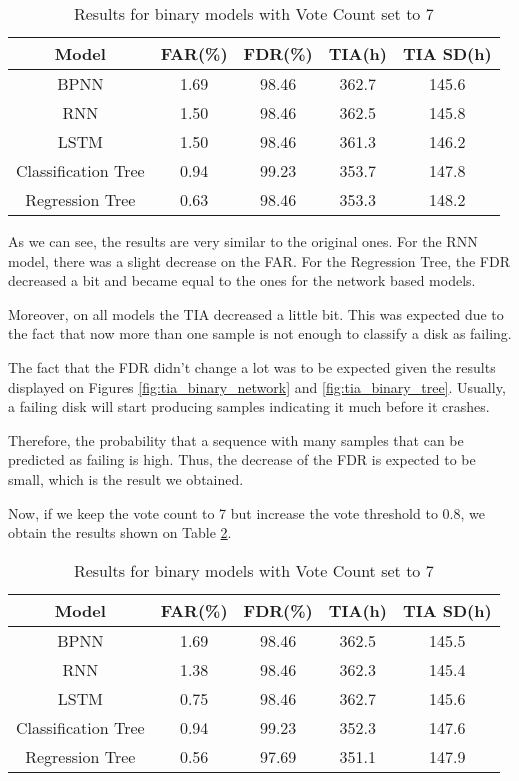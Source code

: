 \begin{table}
  \begin{center}
    \begin{tabular}{|c|c|c|c|c|}
      \hline
    Model & FAR(\%) & FDR(\%) & TIA(h) & TIA SD(h) \\
    \hline
    BPNN & 1.69 & 98.46 & 362.7 & 145.6 \\
    RNN & 1.50 & 98.46 & 362.5 & 145.8 \\
    LSTM & 1.50 & 98.46 & 361.3 & 146.2 \\
    Classification Tree & 0.94 & 99.23 & 353.7 & 147.8 \\
    Regression Tree & 0.63 & 98.46 & 353.3 & 148.2 \\
    \hline
    \end{tabular}
    \caption[Results Binary Models with Voting]{Results for binary models with Vote Count set to 7}
    \label{table:results_binary_voting}
  \end{center}
\end{table}

As we can see, the results are very similar to the original ones.
For the RNN model, there was a slight decrease on the FAR.
For the Regression Tree, the FDR decreased a bit and became equal to the ones for the network based models.

Moreover, on all models the TIA decreased a little bit.
This was expected due to the fact that now more than one sample is not enough to classify a disk as failing.

The fact that the FDR didn't change a lot was to be expected given the results displayed on Figures \ref{fig:tia_binary_network} and \ref{fig:tia_binary_tree}.
Usually, a failing disk will start producing samples indicating it much before it crashes.

Therefore, the probability that a sequence with many samples that can be predicted as failing is high.
Thus, the decrease of the FDR is expected to be small, which is the result we obtained.

Now, if we keep the vote count to 7 but increase the vote threshold to 0.8, we obtain the results shown on Table \ref{table:results_binary_threshold}.

\begin{table}
  \begin{center}
    \begin{tabular}{|c|c|c|c|c|}
      \hline
    Model & FAR(\%) & FDR(\%) & TIA(h) & TIA SD(h) \\
    \hline
    BPNN & 1.69 & 98.46 & 362.5 & 145.5 \\
    RNN & 1.38 & 98.46 & 362.3 & 145.4 \\
    LSTM & 0.75 & 98.46 & 362.7 & 145.6 \\
    Classification Tree & 0.94 & 99.23 & 352.3 & 147.6 \\
    Regression Tree & 0.56 & 97.69 & 351.1 & 147.9 \\
    \hline
    \end{tabular}
    \caption[Results Binary Models with Voting]{Results for binary models with Vote Count set to 7}
    \label{table:results_binary_threshold}
  \end{center}
\end{table}

